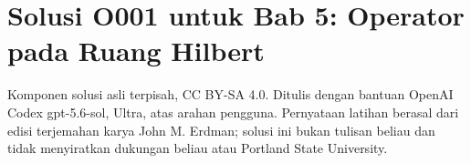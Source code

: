 
\section*{Solusi O001 untuk Bab 5: Operator pada Ruang Hilbert}
\begin{center}
\small
Komponen solusi asli terpisah, CC BY-SA 4.0. Ditulis dengan bantuan
OpenAI Codex gpt-5.6-sol, Ultra, atas arahan pengguna. Pernyataan latihan
berasal dari edisi terjemahan karya John M. Erdman; solusi ini bukan tulisan
beliau dan tidak menyiratkan dukungan beliau atau Portland State University.
\end{center}

